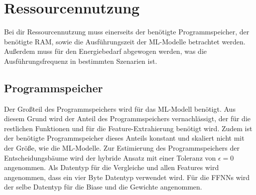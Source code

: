 \section{Ressourcennutzung}
Bei dir Ressourcennutzung muss einerseits der benötigte Programmspeicher, der benötigte RAM, sowie die Ausführungszeit der ML-Modelle betrachtet werden.
Außerdem muss für den Energiebedarf abgewogen werden, was die Ausführungsfrequenz in bestimmten Szenarien ist.

\subsection{Programmspeicher}
Der Großteil des Programmspeichers wird für das ML-Modell benötigt.
Aus diesem Grund wird der Anteil des Programmspeichers vernachlässigt, der für die restlichen Funktionen und für die Feature-Extrahierung benötigt wird.
Zudem ist der benötigte Programmspeicher dieses Anteils konstant und skaliert nicht mit der Größe, wie die ML-Modelle.
Zur Estimierung des Programmspeichers der Entscheidungsbäume wird der hybride Ansatz mit einer Toleranz von $\epsilon=0$ angenommen.
Als Datentyp für die Vergleiche und allen Features wird angenommen, dass ein vier Byte Datentyp verwendet wird.
Für die FFNNs wird der selbe Datentyp für die Biase und die Gewichte angenommen.

